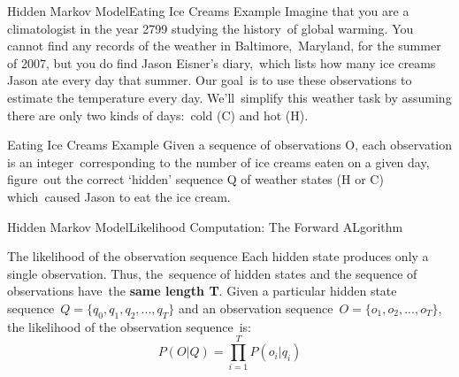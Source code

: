 \documentclass[10pt]{beamer}
\begin{document}
\begin{frame}{Hidden Markov Model}{Eating Ice Creams Example}
   Imagine that you are a climatologist in the year 2799 studying the history\
   of global warming. You cannot find any records of the weather in Baltimore,\
   Maryland, for the summer of 2007, but you do find Jason Eisner’s diary,\
   which lists how many ice creams Jason ate every day that summer. Our goal\
   is to use these observations to estimate the temperature every day. We’ll\
   simplify this weather task by assuming there are only two kinds of days:\
   cold (C) and hot (H).

   \begin{block}{Eating Ice Creams Example}
       Given a sequence of observations O, each observation is an integer\
       corresponding to the number of ice creams eaten on a given day, figure\
       out the correct ‘hidden’ sequence Q of weather states (H or C) which\ 
       caused Jason to eat the ice cream.
   \end{block}
\end{frame}

\begin{frame}{Hidden Markov Model}{Likelihood Computation: The Forward ALgorithm}
   \begin{block}{The likelihood of the observation sequence}
        Each hidden state produces only a single observation. Thus, the\
        sequence of hidden states and the sequence of observations have\
        the \textbf{same length T}. Given a particular hidden state sequence\
        $Q=\{q_0, q_1, q_2, ..., q_T\}$ and an observation sequence\
        $O=\{o_1, o_2, ..., o_T\}$, the likelihood of the observation sequence\
        is:
             \begin{equation}
             \label{likelihood_compute_1}
                  P(O|Q) = \prod_{i=1}^{T}P(o_i|q_i)
             \end{equation}
   \end{block}
\end{frame}
\end{document}
